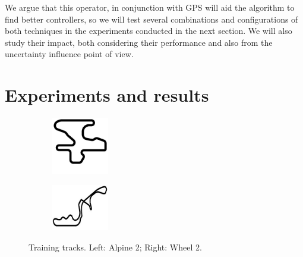 \documentclass[10pt,journal,compsoc]{IEEEtran}
\begin{document}
We argue that this operator, in conjunction with GPS will aid the
algorithm to find better controllers, so we will test several
combinations and configurations of both techniques in the experiments
conducted in the next section. We will also study their impact, both considering their performance and also from the uncertainty influence point of view. 
\section{Experiments and results}  
\label{sec:results}

\begin{figure}[!ht]	
\centering
\begin{subfigure}[b]{0.15\textwidth}
	\centering
	\includegraphics[width=2.5cm]{fig/alpine2}
	\label{fig:alpine2}
\end{subfigure}
\hfill
\begin{subfigure}[b]{0.15\textwidth}
	\centering
	\includegraphics[width=2.5cm]{fig/wheel2}
	\label{fig:wheel2}
\end{subfigure}
\caption{Training tracks. Left: Alpine 2; Right: Wheel 2.}
\label{fig:alpine2_wheel2track}
\end{figure}
\end{document}
